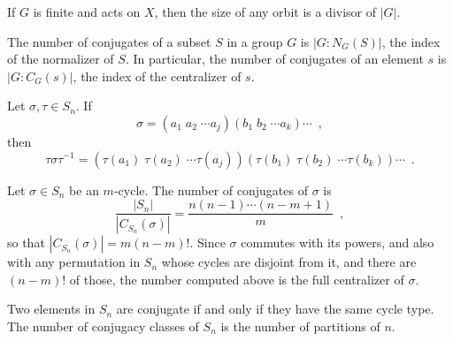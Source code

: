 \begin{corollary}
	\cite[103]{Rotman1967}
	If $G$ is finite and acts on $X$, then the size of any orbit is a divisor of $|G|$.
\end{corollary}

\begin{proposition}
	\cite[123]{DummitFoote2004}
	The number of conjugates of a subset $S$ in a group $G$ is $|G : N_G(S)|$, the index
	of the normalizer of $S$. In particular, the number of conjugates of an element $s$ is
	$|G : C_G(s)|$, the index of the centralizer of $s$.
\end{proposition}

\begin{proposition}
	\cite[125]{DummitFoote2004}
	Let $\sigma, \tau \in S_n$. If
	\begin{equation}
		\sigma = (a_1 \; a_2 \; \cdots a_j) (b_1 \; b_2 \; \cdots a_k) \cdots \enspace,
	\end{equation}
	then
	\begin{equation}
		\tau \sigma \tau^{-1} = (\tau(a_1) \; \tau(a_2) \; \cdots
		\tau(a_j)) (\tau(b_1) \; \tau(b_2) \; \cdots \tau(b_k)) \cdots \enspace.
	\end{equation}
\end{proposition}

\begin{example}
	\cite[127]{DummitFoote2004}
	Let $\sigma \in S_n$ be an $m$-cycle. The number of conjugates of $\sigma$ is
	\begin{equation}
		\frac{|S_n|}{|C_{S_n}(\sigma)|} = \frac{n (n - 1) \cdots (n - m + 1)}{m} \enspace,
	\end{equation}
	so that $|C_{S_n}(\sigma)| = m (n - m)!$. Since $\sigma$ commutes with its powers,
	and also with any permutation in $S_n$ whose cycles are disjoint from it, and there are
	$(n - m)!$ of those, the number computed above is the full centralizer of $\sigma$.
\end{example}

\begin{proposition}
	\cite[126]{DummitFoote2004}
	Two elements in $S_n$ are conjugate if and only if they have the same cycle type.
	The number of conjugacy classes of $S_n$ is the number of partitions of $n$.
\end{proposition}

